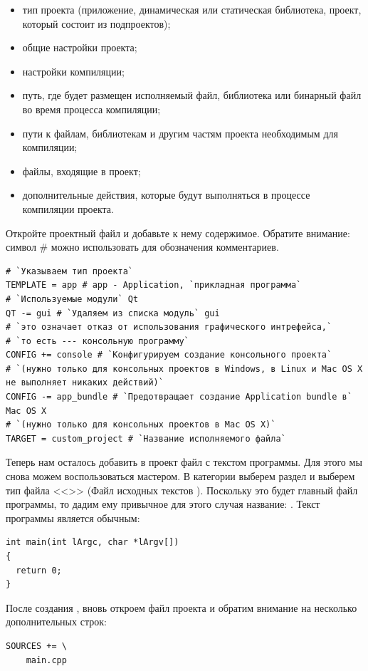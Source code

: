 \begin{itemize}
\item тип проекта (приложение, динамическая или статическая библиотека, проект, который состоит из
подпроектов);
\item общие настройки проекта;
\item настройки компиляции;
\item путь, где будет размещен исполняемый файл, библиотека или бинарный
файл во время процесса компиляции;
\item пути к файлам, библиотекам и другим
частям проекта необходимым для компиляции;
\item файлы, входящие в проект;
\item дополнительные действия, которые будут выполняться в процессе компиляции проекта.
\end{itemize}

Откройте проектный файл и добавьте к нему содержимое. Обратите внимание: символ \#
можно использовать для обозначения комментариев.
\begin{lstlisting}
# `Указываем тип проекта`
TEMPLATE = app # app - Application, `прикладная программа`
# `Используемые модули` Qt 
QT -= gui # `Удаляем из списка модуль` gui
# `это означает отказ от использования графического интрефейса,`
# `то есть --- консольную программу`
CONFIG += console # `Конфигурируем создание консольного проекта`
# `(нужно только для консольных проектов в Windows, в Linux и Mac OS X не выполняет никаких действий)`
CONFIG -= app_bundle # `Предотвращает создание Application bundle в` Mac OS X
# `(нужно только для консольных проектов в Mac OS X)`
TARGET = custom_project # `Название исполняемого файла`
\end{lstlisting}

Теперь нам осталось добавить в проект
файл с текстом программы. Для этого мы снова можем воспользоваться мастером. 
В категории  выберем раздел  и выберем тип файла
<<>> (Файл исходных текстов ).
Поскольку это будет главный файл программы, то дадим ему привычное для
этого случая название: . Текст программы является обычным:
\begin{lstlisting}
int main(int lArgc, char *lArgv[])
{
  return 0;
}
\end{lstlisting}

После создания , вновь откроем файл проекта и обратим внимание на несколько дополнительных строк:
\begin{lstlisting}
SOURCES += \
    main.cpp
\end{lstlisting}

